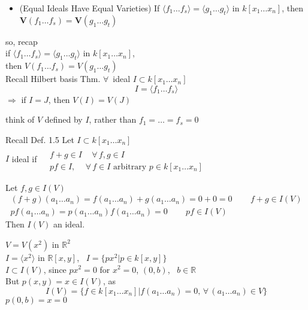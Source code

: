 \documentclass[10pt]{amsart}
\newcommand{\exercisehead}[1]
  { \smallskip
   \noindent{\small\bf Exercise #1.}
  }
\begin{document}
\begin{multicols*}{2}
\begin{itemize}
  \item (Equal Ideals Have Equal Varieties) If $\langle f_1 \dots f_s \rangle = \langle g_1 \dots g_t \rangle$ in $k[x_1 \dots x_n]$, then $\mathbf{V}(f_1 \dots f_s) = \mathbf{V}(g_1 \dots g_t)$
\end{itemize}

so, recap \\
if $\langle f_1 \dots f_s \rangle = \langle g_1 \dots g_t \rangle $ in $k[x_1 \dots x_n]$, \\
then $V(f_1 \dots f_s) = V(g_1 \dots g_t)$   \\

Recall Hilbert basis Thm. $\forall \, $ ideal $I \subset k[x_1 \dots x_n]$ 
\[
I= \langle f_1 \dots f_s \rangle
\]
$\Longrightarrow $ if $I=J$, then $V(I) = V(J)$

think of $V$ defined by $I$, rather than $f_1 = \dots = f_s =0$

\exercisehead{3}

Recall Def. 1.5 Let $I\subset k[x_1 \dots x_n]$ \\
$I$ ideal if $\begin{aligned} & \quad \\
  & f + g \in I  \quad \, \forall \, f,g \in I \\
  & pf \in I, \quad \, \forall \, f \in I \text{ arbitrary } p \in k[x_1 \dots x_n]
\end{aligned}$

Let $f,g \in I(V)$ 
\[
\begin{gathered}
  (f+g)(a_1 \dots a_n) = f(a_1 \dots a_n) + g(a_1 \dots a_n) = 0 + 0 = 0 \quad \quad \, f+g \in I(V) \\ 
  pf(a_1 \dots a_n) = p(a_1 \dots a_n) f(a_1 \dots a_n) = 0 \quad \quad \, pf \in I(V)
\end{gathered}
\]
Then $I(V)$ an ideal.



$V = V(x^2)$ in $\mathbb{R}^2$ \\
$I=\langle x^2 \rangle$ in $\mathbb{R}[x,y]$, \, $I= \lbrace px^2 | p \in k[x,y]\rbrace$ \\
\phantom{ \quad } $I \subset I(V)$, since $px^2 = 0$ for $x^2=0$, $(0,b)$, \, $b\in \mathbb{R}$ \\
But $p(x,y) = x\in I(V)$, as 
\[
I(V) = \lbrace f \in k[x_1 \dots x_n] | f(a_1 \dots a_n)=0, \, \forall \, (a_1\dots a_n) \in V\rbrace
\]
\phantom{ \quad \quad } $p(0,b) = x = 0$


\end{multicols*}
\end{document}
